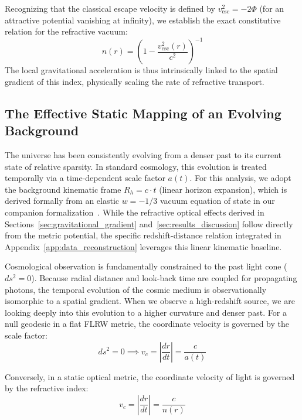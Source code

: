 \documentclass[11pt]{article}
\begin{document}
Recognizing that the classical escape velocity is defined by $v_{\mathrm{esc}}^2 = -2\Phi$ (for an attractive potential vanishing at infinity), we establish the exact constitutive relation for the refractive vacuum:
\begin{equation}
\label{eq:n_vesc}
n(r) = \left(1 - \frac{v_{\mathrm{esc}}^2(r)}{c^2}\right)^{-1}
\end{equation}
The local gravitational acceleration is thus intrinsically linked to the spatial gradient of this index, physically scaling the rate of refractive transport.

\subsection{The Effective Static Mapping of an Evolving Background}
The universe has been consistently evolving from a denser past to its current state of relative sparsity. In standard cosmology, this evolution is treated temporally via a time-dependent scale factor $a(t)$. For this analysis, we adopt the background kinematic frame $R_h = c \cdot t$ (linear horizon expansion), which is derived formally from an elastic $w = -1/3$ vacuum equation of state in our companion formalization~\cite{RefractivePackage2026}. While the refractive optical effects derived in Sections~\ref{sec:gravitational_gradient} and~\ref{sec:results_discussion} follow directly from the metric potential, the specific redshift-distance relation integrated in Appendix~\ref{app:data_reconstruction} leverages this linear kinematic baseline.

Cosmological observation is fundamentally constrained to the past light cone ($ds^2 = 0$). Because radial distance and look-back time are coupled for propagating photons, the temporal evolution of the cosmic medium is observationally isomorphic to a spatial gradient. When we observe a high-redshift source, we are looking deeply into this evolution to a higher curvature and denser past. For a null geodesic in a flat FLRW metric, the coordinate velocity is governed by the scale factor:
\begin{equation}
ds^2 = 0 \implies v_c = \left| \frac{dr}{dt} \right| = \frac{c}{a(t)}
\end{equation}

Conversely, in a static optical metric, the coordinate velocity of light is governed by the refractive index:
\begin{equation}
v_c = \left| \frac{dr}{dt} \right| = \frac{c}{n(r)}
\end{equation}
\end{document}

